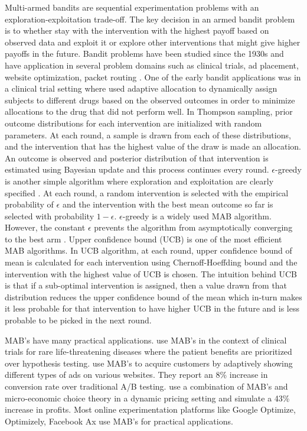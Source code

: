 \documentclass[12pt, letterpaper]{article}
\begin{document}
Multi-armed bandits are sequential experimentation problems with an exploration-exploitation trade-off. The key decision in an armed bandit problem is to whether stay with the intervention with the highest payoff based on observed data and exploit it or explore other interventions that might give higher payoffs in the future. Bandit problems have been studied since the 1930s and have application in several problem domains such as clinical trials, ad placement, website optimization, packet routing \citep{bubeck2012regret}. One of the early bandit applications was in a clinical trial setting where \cite{thompson1933likelihood} used adaptive allocation to dynamically assign subjects to different drugs based on the observed outcomes in order to minimize allocations to the drug that did not perform well. In Thompson sampling, prior outcome distributions for each intervention are initialized with random parameters. At each round, a sample is drawn from each of these distributions, and the intervention that has the highest value of the draw is made an allocation. An outcome is observed and posterior distribution of that intervention is estimated using Bayesian update and this process continues every round. $\epsilon$-greedy is another simple algorithm where exploration and exploitation are clearly specified \citep{kuleshov2014algorithms}. At each round, a random intervention is selected with the empirical probability of $\epsilon$ and the intervention with the best mean outcome so far is selected with probability $1-\epsilon$. $\epsilon$-greedy is a widely used MAB algorithm. However, the constant $\epsilon$ prevents the algorithm from asymptotically converging to the best arm \citep{vermorel2005multi}. Upper confidence bound (UCB) is one of the most efficient MAB algorithms.  In UCB algorithm, at each round, upper confidence bound of mean is calculated for each intervention using Chernoff-Hoeffding bound \citep{chernoff1952measure} and the intervention with the highest value of UCB is chosen. The intuition behind UCB is that if a sub-optimal intervention is assigned, then a value drawn from that distribution reduces the upper confidence bound of the mean which in-turn makes it less probable for that intervention to have higher UCB in the future and is less probable to be picked in the next round. 

MAB's have many practical applications. \cite{villar2018bandit} use MAB's in the context of clinical trials for rare life-threatening diseases where the patient benefits are prioritized over hypothesis testing. \cite{schwartz2017customer} use MAB's to acquire customers by adaptively showing different types of ads on various websites. They report an 8\% increase in conversion rate over traditional A/B testing. \cite{misra2019dynamic} use a combination of MAB's and micro-economic choice theory in a dynamic pricing setting and simulate a 43\% increase in profits. Most online experimentation platforms like Google Optimize, Optimizely, Facebook Ax use MAB's for practical applications.
\end{document}
